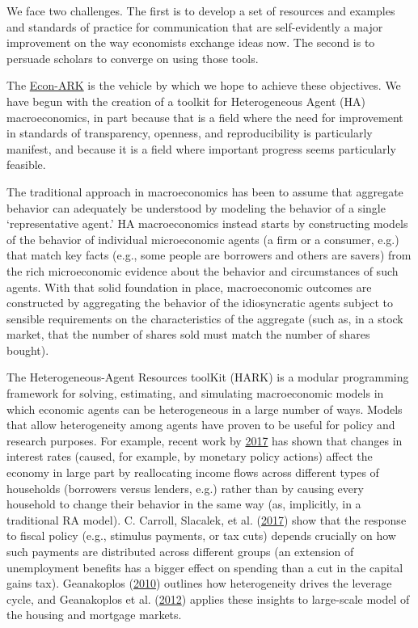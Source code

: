 \documentclass[10pt,twocolumn]{article}
\providecommand{\EconARK}{\href{http://econ-ark.org}{Econ-ARK}}
\begin{document}
We face two challenges.  The first is to develop a set of resources and examples and standards of practice for communication that are self-evidently a major improvement on the way economists exchange ideas now.  The second is to persuade scholars to converge on using those tools.

The {\EconARK} is the vehicle by which we hope to achieve these objectives.  We have begun with the creation of a toolkit for Heterogeneous Agent (HA) macroeconomics, in part because that is a field where the need for improvement in standards of transparency, openness, and reproducibility is particularly manifest, and because it is a field where important progress seems particularly feasible.

The traditional approach in macroeconomics has been to assume that aggregate behavior can adequately be understood by modeling the behavior of a single `representative agent.'  HA macroeconomics instead starts by constructing models of the behavior of individual microeconomic agents (a firm or a consumer, e.g.) that match key facts (e.g., some people are borrowers and others are savers) from the rich microeconomic evidence about the behavior and circumstances of such agents. With that solid foundation in place, macroeconomic outcomes are constructed by aggregating the behavior of the idiosyncratic agents subject to sensible requirements on the characteristics of the aggregate (such as, in a stock market, that the number of shares sold must match the number of shares bought).

The Heterogeneous-Agent Resources toolKit (HARK) is a modular programming framework for solving, estimating, and simulating macroeconomic models in which economic agents can be heterogeneous in a large number of ways.  Models that allow heterogeneity among agents have proven to be useful for policy and research purposes. For example, recent work by \protect\hyperlink{kmvHANK}{2017} has shown that changes in interest rates (caused, for example, by monetary policy actions) affect the economy in large part by reallocating income flows across different types of households (borrowers versus lenders, e.g.) rather than by causing every household to change their behavior in the same way (as, implicitly, in a traditional RA model).  C. Carroll, Slacalek, et al.  (\protect\hyperlink{ref-carroll2017distribution}{2017}) show that the response to fiscal policy (e.g., stimulus payments, or tax cuts) depends crucially on how such payments are distributed across different groups (an extension of unemployment benefits has a bigger effect on spending than a cut in the capital gains tax). Geanakoplos (\protect\hyperlink{ref-geanakoplos2010leverage}{2010}) outlines how heterogeneity drives the leverage cycle, and Geanakoplos et al.  (\protect\hyperlink{ref-geanakoplos2012getting}{2012}) applies these insights to large-scale model of the housing and mortgage markets.
\end{document}
